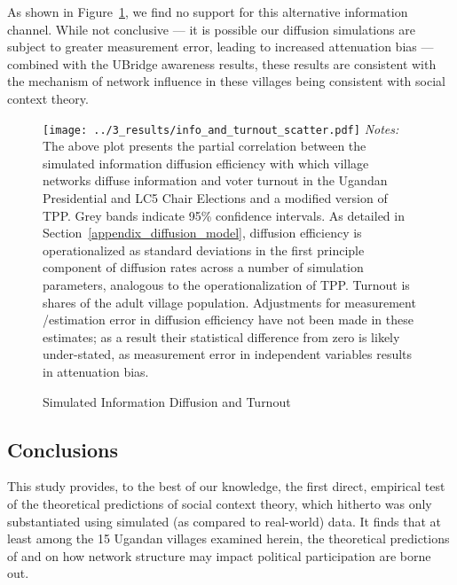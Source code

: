 \documentclass[12pt]{article}
\begin{document}
As shown in Figure~\ref{figure_info_diffusion_turnout}, we find no support for this alternative information channel. While not conclusive --- it is possible our diffusion simulations are subject to greater measurement error, leading to increased attenuation bias --- combined with the UBridge awareness results, these results are consistent with the mechanism of network influence in these villages being consistent with social context theory.

\begin{figure}[!h]
    \caption{Simulated Information Diffusion and Turnout}
    \label{figure_info_diffusion_turnout}
    \texttt{[image: ../3\_results/info\_and\_turnout\_scatter.pdf]}
	\scriptsize{\emph{Notes:}  The above plot presents the partial correlation between the simulated information diffusion efficiency with which village networks diffuse information and voter turnout in the Ugandan Presidential and LC5 Chair Elections and a modified version of TPP.  Grey bands indicate 95\% confidence intervals.  As detailed in Section~\ref{appendix_diffusion_model}, diffusion efficiency is operationalized as standard deviations in the first principle component of diffusion rates across a number of simulation parameters, analogous to the operationalization of TPP. Turnout is shares of the adult village population. Adjustments for measurement /estimation error in diffusion efficiency have not been made in these estimates; as a result their statistical difference from zero is likely under-stated, as measurement error in independent variables results in attenuation bias.}
\end{figure}



\subsection{Conclusions}

This study provides, to the best of our knowledge, the first direct, empirical test of the theoretical predictions of social context theory, which hitherto was only substantiated using simulated (as compared to real-world) data. It finds that at least among the 15 Ugandan villages examined herein, the theoretical predictions of \cite{Siegel:2009vi} and \cite{Rolfe:2012ka} on how network structure may impact political participation are borne out.
\end{document}
